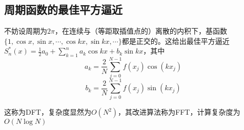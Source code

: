 \documentclass{ctexart}
\begin{document}
\subsection{周期函数的最佳平方逼近}
不妨设周期为$2\pi$，在连续与（等距取插值点的）离散的内积下，基函数$\{1,\cos x,\sin x,\cdots,\cos kx,\sin kx,\cdots\}$都是正交的。这给出最佳平方逼近$S_n^*(x)=\frac{1}{2}a_0+\sum_{k=1}^n a_k\cos kx+b_k \sin kx$，其中
\[a_k=\frac{2}{N}\sum_{j=0}^{N-1}f(x_j)\cos (kx_j)\]
\[b_k=\frac{2}{N}\sum_{j=0}^{N-1}f(x_j)\sin (kx_j)\]

这称为DFT，复杂度显然为$O(N^2)$，其改进算法称为FFT，计算复杂度为$O(N\log N)$
\end{document}
